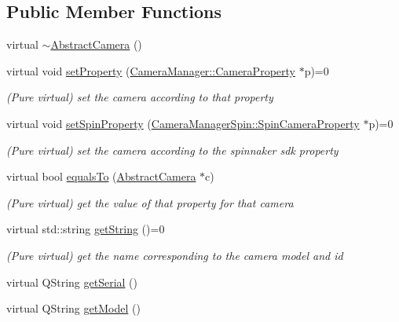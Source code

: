 \subsection*{Public Member Functions}
\begin{DoxyCompactItemize}
\item 
virtual \mbox{\hyperlink{class_abstract_camera_addf550f9f41d04bd6651b19d795bdabe}{$\sim$\+Abstract\+Camera}} ()
\item 
virtual void \mbox{\hyperlink{class_abstract_camera_a8b50d3e4925cfe74ed383376ba02bb5e}{set\+Property}} (\mbox{\hyperlink{class_camera_manager_1_1_camera_property}{Camera\+Manager\+::\+Camera\+Property}} $\ast$p)=0
\begin{DoxyCompactList}\small\item\em (Pure virtual) set the camera according to that property \end{DoxyCompactList}\item 
virtual void \mbox{\hyperlink{class_abstract_camera_ac6943d94ae61e2c8d431bf9fe9d55313}{set\+Spin\+Property}} (\mbox{\hyperlink{class_camera_manager_spin_1_1_spin_camera_property}{Camera\+Manager\+Spin\+::\+Spin\+Camera\+Property}} $\ast$p)=0
\begin{DoxyCompactList}\small\item\em (Pure virtual) set the camera according to the spinnaker sdk property \end{DoxyCompactList}\item 
virtual bool \mbox{\hyperlink{class_abstract_camera_a244917ab081c18caf389473847871dd6}{equals\+To}} (\mbox{\hyperlink{class_abstract_camera}{Abstract\+Camera}} $\ast$c)
\begin{DoxyCompactList}\small\item\em (Pure virtual) get the value of that property for that camera \end{DoxyCompactList}\item 
virtual std\+::string \mbox{\hyperlink{class_abstract_camera_a75dc6b53d5a8717944d5e8ded9609611}{get\+String}} ()=0
\begin{DoxyCompactList}\small\item\em (Pure virtual) get the name corresponding to the camera model and id \end{DoxyCompactList}\item 
virtual Q\+String \mbox{\hyperlink{class_abstract_camera_a0dcd65fa3bcc83ba95ffdb0a9044a407}{get\+Serial}} ()
\item 
virtual Q\+String \mbox{\hyperlink{class_abstract_camera_ae263e210c55f094ef5b8fc8cb3341043}{get\+Model}} ()

\end{DoxyCompactItemize}
